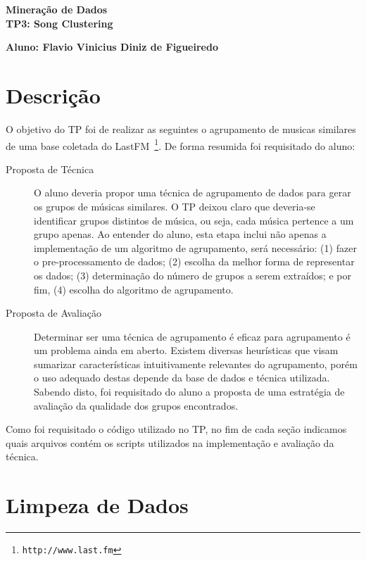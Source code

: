 \documentclass[brazil,a4paper,12pt]{article}
\begin{document}
\begin{center}
\LARGE
\textbf{Mineração de Dados}\\
\textbf{TP3: Song Clustering}\\
\end{center}
\begin{center}
\textbf{Aluno: Flavio Vinicius Diniz de Figueiredo}
\end{center}

\section{Descrição}

O objetivo do TP foi de realizar as seguintes o agrupamento de musicas
similares de uma base coletada do LastFM~\footnote{\texttt{http://www.last.fm}}.
De forma resumida foi requisitado do aluno:

\begin{description}

\item [Proposta de Técnica] O aluno deveria propor uma técnica de agrupamento de
dados para gerar os grupos de músicas similares. O TP deixou claro que deveria-se
identificar grupos distintos de música, ou seja, cada música pertence a um grupo
apenas. Ao entender do aluno, esta etapa inclui não apenas a implementação de um
algoritmo de agrupamento, será necessário: (1) fazer o pre-processamento de dados;
(2) escolha da melhor forma de representar os dados; (3) determinação do número de
grupos a serem extraídos; e por fim, (4) escolha do algoritmo de agrupamento.

\item [Proposta de Avaliação] Determinar ser uma técnica de agrupamento é eficaz
para agrupamento é um problema ainda em aberto. Existem diversas heurísticas que
visam sumarizar características intuitivamente relevantes do agrupamento, porém
o uso adequado destas depende da base de dados e técnica utilizada. Sabendo disto,
foi requisitado do aluno a proposta de uma estratégia de avaliação da qualidade dos
grupos encontrados.

\end{description}

\noindent Como foi requisitado o código utilizado no TP, no fim de cada seção 
indicamos quais arquivos contém os scripts utilizados na implementação e avaliação 
da técnica.

\section{Limpeza de Dados}
\end{document}
